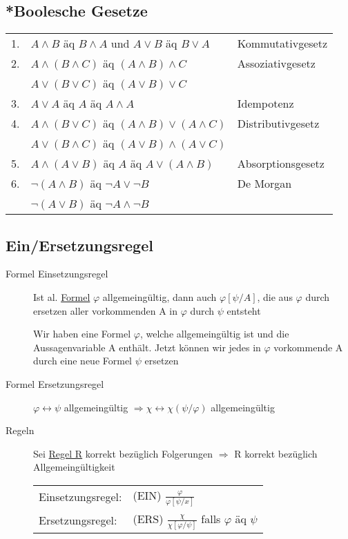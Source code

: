 \documentclass[12pt,a4paper]{article} %
\begin{document}
	\subsection{*Boolesche Gesetze}
	\begin{tabular}{l l l}
		1. & $A \land B$ äq $B \land A$ und $A \lor B$ äq $B \lor A$ & Kommutativgesetz \\
		2. & $A \land(B \land C)$ äq $(A \land B) \land C$ & Assoziativgesetz \\
		& $A \lor (B \lor C)$ äq $(A \lor B) \lor C$ & \\
		3. & $A \lor A$ äq $A$ äq $A \land A$ & Idempotenz \\
		4. & $A \land (B \lor C)$ äq $(A \land B) \lor (A \land C)$ & Distributivgesetz \\
		& $A \lor (B \land C)$ äq $(A \lor B) \land (A \lor C)$ & \\
		5. & $A \land (A \lor B)$ äq $A$ äq $A \lor (A \land B)$ & Absorptionsgesetz \\
		6. & $\neg (A \land B)$ äq $\neg A \lor \neg B$ & De Morgan \\
		& $\neg (A \lor B)$ äq $\neg A \land \neg B$ &
	\end{tabular}

	\subsection{Ein/Ersetzungsregel}
	\begin{description}
		\item[Formel Einsetzungsregel] Ist al. \hyperref[Formel]{Formel} $\varphi$ allgemeingültig, dann auch $\varphi[\psi/A]$, die aus $\varphi$ durch ersetzen aller vorkommenden A in $\varphi$ durch $\psi$ entsteht
		
		Wir haben eine Formel $\varphi$, welche allgemeingültig ist und die Aussagenvariable A enthält. Jetzt können wir jedes in $\varphi$ vorkommende A durch eine neue Formel $\psi$ ersetzen 
		\item[Formel Ersetzungsregel] $\varphi \leftrightarrow \psi$ allgemeingültig $\Rightarrow \chi \leftrightarrow \chi (\psi/\varphi)$ allgemeingültig
		\item[Regeln] Sei \hyperref[Kalkul]{Regel R} korrekt bezüglich Folgerungen $\Rightarrow$ R korrekt bezüglich Allgemeingültigkeit
		
		\begin{tabular}{l l}
			Einsetzungsregel: & (EIN) $\frac{\varphi}{\varphi[\psi/x]}$ \\
			Ersetzungsregel: & (ERS) $\frac{\chi}{\chi[\varphi/\psi]}$ falls $\varphi$ äq $\psi$
		\end{tabular}
	\end{description}
		
\end{document}
